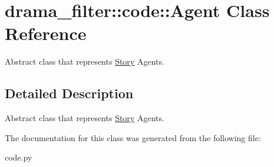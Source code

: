 \hypertarget{classdrama__filter_1_1code_1_1Agent}{
\section{drama\_\-filter::code::Agent Class Reference}
\label{classdrama__filter_1_1code_1_1Agent}
}


Abstract class that represents \hyperlink{classdrama__filter_1_1code_1_1Story}{Story} Agents.  




\subsection{Detailed Description}
Abstract class that represents \hyperlink{classdrama__filter_1_1code_1_1Story}{Story} Agents. 

The documentation for this class was generated from the following file:\begin{DoxyCompactItemize}
\item 
code.py\end{DoxyCompactItemize}
